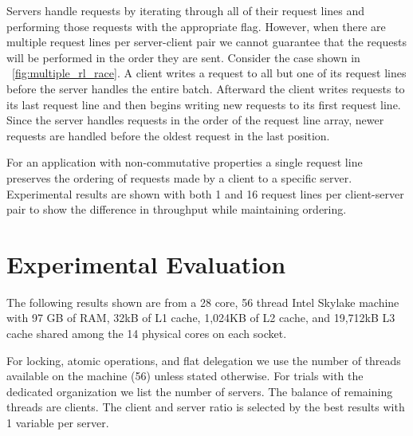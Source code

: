 \documentclass{uicthesi}
\begin{document}
Servers handle requests by iterating through all of their request lines and performing those requests with the appropriate flag. However, when there are multiple request lines per server-client pair we cannot guarantee that the requests will be performed in the order they are sent. Consider the case shown in ~\ref{fig:multiple_rl_race}.  A client writes a request to all but one of its request lines before the server handles the entire batch. Afterward the client writes requests to its last request line and then begins writing new requests to its first request line. Since the server handles requests in the order of the request line array, newer requests are handled before the oldest request in the last position. 

For an application with non-commutative properties a single request line preserves the ordering of requests made by a client to a specific server. Experimental results are shown with both 1 and 16 request lines per client-server pair to show the difference in throughput while maintaining ordering. 


\chapter{Experimental Evaluation}
The following results shown are from a 28 core, 56 thread Intel Skylake machine with 97 GB of RAM, 32kB of L1 cache, 1,024KB of L2 cache, and 19,712kB L3 cache shared among the 14 physical cores on each socket. 

For locking, atomic operations, and flat delegation we use the number of threads available on the machine (56) unless stated otherwise. For trials with the dedicated organization we list the number of servers. The balance of remaining threads are clients.  The client and server ratio is selected by the best results with 1 variable per server. 
\end{document}
